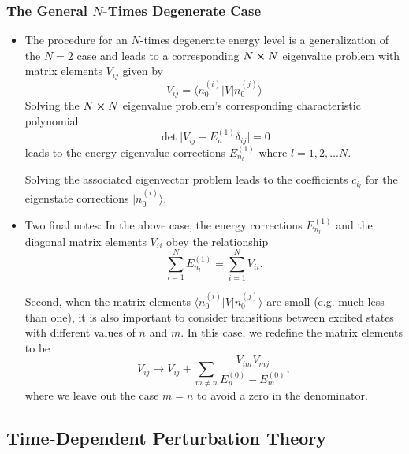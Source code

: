 \documentclass[11pt, a4paper]{article}
\newcommand{\bket}[1]{\big | {#1} \big \rangle }
\newcommand{\bmel}[3]{\big \langle {#1} \big | {#2} \big | {#3} \big \rangle}  %
\begin{document}
\subsubsection{The General $ N $-Times Degenerate Case}
\begin{itemize}
    \item The procedure for an $ N $-times degenerate energy level is a generalization of the $ N = 2 $ case and leads to a corresponding $ N \cross N $ eigenvalue problem with matrix elements $ V_{ij} $ given by
    \begin{equation*}
        V_{ij} = \bmel{n_{0}^{(i)}}{V}{n_{0}^{(j)}}
    \end{equation*}
    Solving the $ N \cross N $ eigenvalue problem's corresponding characteristic polynomial
    \begin{equation*}
        \det \big[ V_{ij} - E_{n}^{(1)}\delta_{ij} \big] = 0
    \end{equation*}
    leads to the energy eigenvalue corrections $ E_{n_{l}}^{(1)} $ where $ l = 1, 2, \ldots N $. 

    Solving the associated eigenvector problem leads to the coefficients $ c_{i_{l}} $ for the eigenstate corrections $ \bket{n_{0}^{(i)}} $.
    
    \item Two final notes: In the above case, the energy corrections $ E_{n_{l}}^{(1)} $ and the diagonal matrix elements $ V_{ii} $ obey the relationship
    \begin{equation*}
        \sum_{l = 1}^{N} E_{n_{l}}^{(1)} = \sum_{i = 1}^{N}V_{ii}.
    \end{equation*}
    
    Second, when the matrix elements $ \bmel{n_{0}^{(i)}}{V}{n_{0}^{(j)}} $ are small (e.g. much less than one), it is also important to consider transitions between excited states with different values of $ n $ and $ m $. In this case, we redefine the matrix elements to be
    \begin{equation*}
        V_{ij} \to V_{ij} + \sum_{m\neq n} \frac{V_{im}V_{mj}}{E_{n}^{(0)} - E_{m}^{(0)}},
    \end{equation*}
    where we leave out the case $ m = n $ to avoid a zero in the denominator.
    
\end{itemize}

\subsection{Time-Dependent Perturbation Theory}
\end{document}

